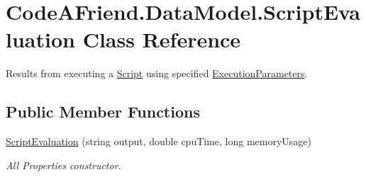 \hypertarget{class_code_a_friend_1_1_data_model_1_1_script_evaluation}{}\section{Code\+A\+Friend.\+Data\+Model.\+Script\+Evaluation Class Reference}
\label{class_code_a_friend_1_1_data_model_1_1_script_evaluation}


Results from executing a \mbox{\hyperlink{class_code_a_friend_1_1_data_model_1_1_script}{Script}} using specified \mbox{\hyperlink{class_code_a_friend_1_1_data_model_1_1_execution_parameters}{Execution\+Parameters}}.  


\subsection*{Public Member Functions}
\begin{DoxyCompactItemize}
\item 
\mbox{\hyperlink{class_code_a_friend_1_1_data_model_1_1_script_evaluation_abd3a2ec93bde80977a8c2b6609178a88}{Script\+Evaluation}} (string output, double cpu\+Time, long memory\+Usage)
\begin{DoxyCompactList}\small\item\em All Properties constructor. \end{DoxyCompactList}\end{DoxyCompactItemize}
